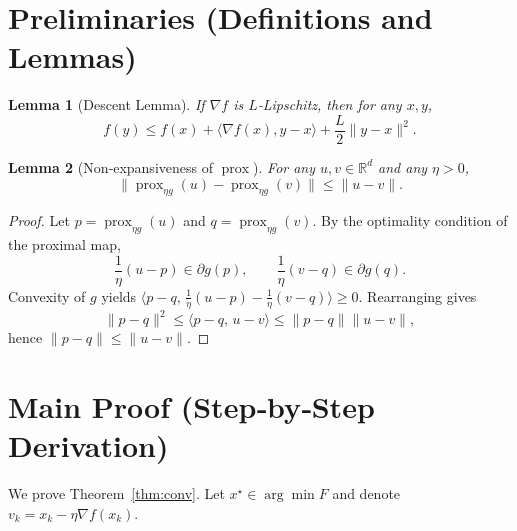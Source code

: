 \documentclass{article}
\newtheorem{lemma}{Lemma}
\begin{document}
\section*{Preliminaries (Definitions and Lemmas)}
\begin{lemma}[Descent Lemma]\label{lem:descent}
If $\nabla f$ is $L$‑Lipschitz, then for any $x,y$,
\[
f(y)\le f(x)+\langle\nabla f(x),y-x\rangle+\frac{L}{2}\|y-x\|^{2}.
\]
\end{lemma}
\begin{lemma}[Non‑expansiveness of $\operatorname{prox}$]\label{lem:nonexpansive}
For any $u,v\in\mathbb{R}^{d}$ and any $\eta>0$,
\[
\bigl\|\operatorname{prox}_{\eta g}(u)-\operatorname{prox}_{\eta g}(v)\bigr\|
\le\|u-v\|.
\]
\end{lemma}
\begin{proof}
Let $p=\operatorname{prox}_{\eta g}(u)$ and $q=\operatorname{prox}_{\eta g}(v)$. By the optimality condition of the proximal map,
\[
\frac{1}{\eta}(u-p)\in\partial g(p),\qquad 
\frac{1}{\eta}(v-q)\in\partial g(q).
\]
Convexity of $g$ yields $\langle p-q,\,\frac{1}{\eta}(u-p)-\frac{1}{\eta}(v-q)\rangle\ge0$. Rearranging gives
\[
\|p-q\|^{2}\le\langle p-q,\,u-v\rangle\le\|p-q\|\|u-v\|,
\]
hence $\|p-q\|\le\|u-v\|$.
\end{proof}

\section*{Main Proof (Step‑by‑Step Derivation)}
We prove Theorem~\ref{thm:conv}.  
Let $x^{\star}\in\arg\min F$ and denote $v_{k}=x_{k}-\eta\nabla f(x_{k})$.
\end{document}
